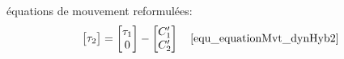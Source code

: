\documentclass[11pt]{beamer}
\begin{document}
\begin{frame}
\begin{columns}[t]
\begin{column}{.37\textwidth}
\begin{block}{équations de mouvement reformulées:}
\begin{align*}
\begin{bmatrix}
		  \tau_2
		\end{bmatrix} 
		&=
		\begin{bmatrix}
		  \tau_1 \\
		  0
		\end{bmatrix} 
		-
		\begin{bmatrix}
		  C'_{1} \\
		  C'_{2}
		\end{bmatrix} \quad \eqref{equ_equationMvt_dynHyb2} \\
		\end{align*}
	\end{block}
  \end{column}
  \end{columns}

\end{frame}

%  
%
\end{document}

